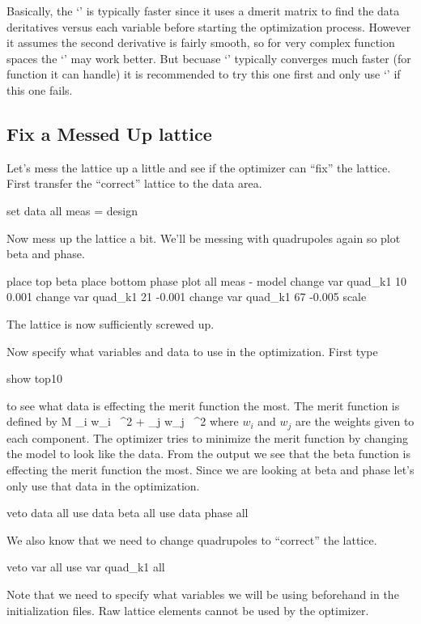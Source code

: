 Basically, the `' is typically faster since it uses a dmerit matrix to find
the data deritatives versus each variable before starting the optimization process.
However it assumes the second derivative is fairly smooth, so for very complex function 
spaces the `' may work better. But becuase `' typically converges much faster
(for function it can handle) it is recommended to try this one first and only use `'
if this one fails. 

\subsection{Fix a Messed Up lattice}
\label{ss:fix_it}

Let's mess the lattice up a little and see if the optimizer can ``fix'' the
lattice. First transfer the ``correct'' lattice to the  data area.
\begin{example}
  set data all meas = design
\end{example}
Now mess up the lattice a bit. We'll be messing with quadrupoles again so plot
beta and phase.
\begin{example}
  place top beta
  place bottom phase
  plot all meas - model
  change var quad\_k1 10 0.001
  change var quad\_k1 21 -0.001
  change var quad\_k1 67 -0.005
  scale
\end{example}
The lattice is now sufficiently screwed up.

Now specify what variables and data to use in the optimization. First type
\begin{example}
  show top10
\end{example}
to see what data is effecting the merit function the most. The merit function is
defined by
\Begineq
  {\cal M} \equiv \sum_{i} w_i \,
    ^2 + 
  \sum_{j} w_j \,
    ^2
  \label{m1}
\Endeq
where $w_{i}$ and $w_{j}$ are the weights given to each component.
The optimizer tries to minimize the merit function by changing the model to look
like the data. From the  output we see that the beta function is effecting 
the merit function the most. Since we
are looking at beta and phase let's only use that data in the optimization.
\begin{example}
  veto data all
  use  data beta all
  use  data phase all
\end{example}
We also know that we need to change quadrupoles to ``correct'' the lattice.
\begin{example}
  veto var all
  use var quad\_k1 all
\end{example}
Note that we need to specify what variables we will be using beforehand in the
initialization files. Raw lattice elements cannot be used by the optimizer. 

